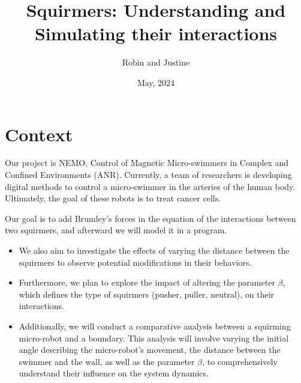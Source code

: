 \documentclass[options]{article}
\begin{document}
\title{Squirmers: Understanding and Simulating their interactions}
\author{Robin and Justine}
\date{May, 2024}
\maketitle

\section{Context}
Our project is NEMO, Control of Magnetic Micro-swimmers in Complex and Confined Environments (ANR).
Currently, a team of researchers is developing digital methods to control a micro-swimmer in the arteries
of the human body.
Ultimately, the goal of these robots is to treat cancer cells.

\vspace{0.5cm}
Our goal is to add Brumley's forces in the equation of the interactions between two squirmers, 
and afterward we will model it in a program. 
\begin{itemize}
    \item We also aim to investigate the effects of varying the distance between the squirmers to observe
    potential modifications in their behaviors.
    \item Furthermore, we plan to explore the impact of altering the parameter $\beta$, which defines the
    type of squirmers (pusher, puller, neutral), on their interactions.
    \item Additionally, we will conduct a comparative analysis between a squirming micro-robot and a 
    boundary. This analysis will involve varying the initial angle describing the micro-robot's 
    movement, the distance between the swimmer and the wall, as well as the parameter $\beta$, 
    to comprehensively understand their influence on the system dynamics.
\end{itemize}
\end{document}
